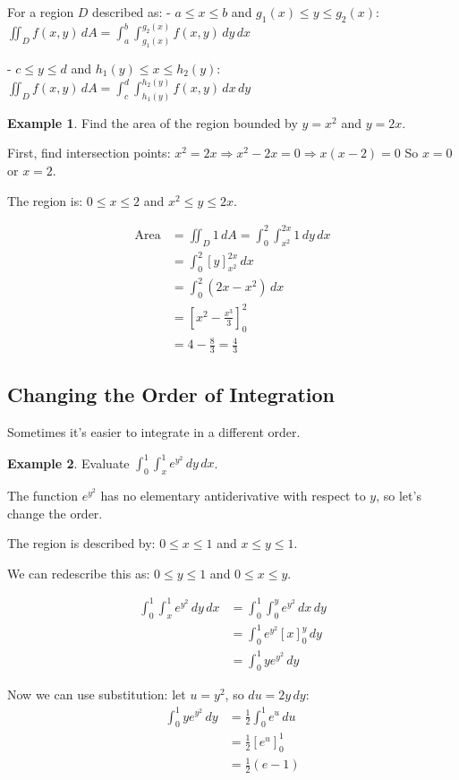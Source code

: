 \documentclass[12pt,a4paper]{book}
\theoremstyle{definition}
\newtheorem{example}{Example}[chapter]
\begin{document}
\begin{keyformula}
For a region $D$ described as:
- $a \leq x \leq b$ and $g_1(x) \leq y \leq g_2(x)$:
$\iint_D f(x,y) \, dA = \int_a^b \int_{g_1(x)}^{g_2(x)} f(x,y) \, dy \, dx$

- $c \leq y \leq d$ and $h_1(y) \leq x \leq h_2(y)$:
$\iint_D f(x,y) \, dA = \int_c^d \int_{h_1(y)}^{h_2(y)} f(x,y) \, dx \, dy$
\end{keyformula}

\begin{example}
Find the area of the region bounded by $y = x^2$ and $y = 2x$.

First, find intersection points: $x^2 = 2x \Rightarrow x^2 - 2x = 0 \Rightarrow x(x-2) = 0$
So $x = 0$ or $x = 2$.

The region is: $0 \leq x \leq 2$ and $x^2 \leq y \leq 2x$.

\begin{align}
\text{Area} &= \iint_D 1 \, dA = \int_0^2 \int_{x^2}^{2x} 1 \, dy \, dx\\
&= \int_0^2 [y]_{x^2}^{2x} \, dx\\
&= \int_0^2 (2x - x^2) \, dx\\
&= \left[ x^2 - \frac{x^3}{3} \right]_0^2\\
&= 4 - \frac{8}{3} = \frac{4}{3}
\end{align}
\end{example}

\subsection{Changing the Order of Integration}

Sometimes it's easier to integrate in a different order.

\begin{example}
Evaluate $\int_0^1 \int_x^1 e^{y^2} \, dy \, dx$.

The function $e^{y^2}$ has no elementary antiderivative with respect to $y$, so let's change the order.

The region is described by: $0 \leq x \leq 1$ and $x \leq y \leq 1$.

We can redescribe this as: $0 \leq y \leq 1$ and $0 \leq x \leq y$.

\begin{align}
\int_0^1 \int_x^1 e^{y^2} \, dy \, dx &= \int_0^1 \int_0^y e^{y^2} \, dx \, dy\\
&= \int_0^1 e^{y^2} [x]_0^y \, dy\\
&= \int_0^1 ye^{y^2} \, dy
\end{align}

Now we can use substitution: let $u = y^2$, so $du = 2y \, dy$:
\begin{align}
\int_0^1 ye^{y^2} \, dy &= \frac{1}{2} \int_0^1 e^u \, du\\
&= \frac{1}{2}[e^u]_0^1\\
&= \frac{1}{2}(e - 1)
\end{align}
\end{example}
\end{document}
